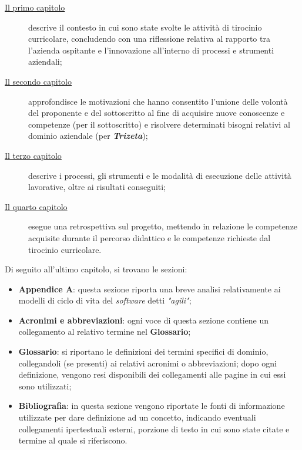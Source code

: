 \begin{description}
    \item[{\hyperref[cap:contesto-svolgimento]{Il primo capitolo}}] descrive il contesto in cui sono state svolte le attività di tirocinio curricolare, concludendo con una riflessione relativa al rapporto tra l'azienda ospitante e l'innovazione all'interno di processi e strumenti aziendali; 
    
    \item[{\hyperref[cap:motivazioni-tirocinio]{Il secondo capitolo}}] approfondisce le motivazioni che hanno consentito l'unione delle volontà del proponente e del sottoscritto al fine di acquisire nuove conoscenze e competenze (per il sottoscritto) e risolvere determinati bisogni relativi al dominio aziendale (per \textbf{\textit{Trizeta}});
    
    \item[{\hyperref[cap:elementi-progetto]{Il terzo capitolo}}] descrive i processi, gli strumenti e le modalità di esecuzione delle attività lavorative, oltre ai risultati conseguiti;
    
    \item[{\hyperref[cap:resoconto]{Il quarto capitolo}}] esegue una retrospettiva sul progetto, mettendo in relazione le competenze acquisite durante il percorso didattico e le competenze richieste dal tirocinio curricolare.
\end{description}

Di seguito all'ultimo capitolo, si trovano le sezioni:
\begin{itemize}
    \item \textbf{Appendice A}: questa sezione riporta una breve analisi relativamente ai modelli di ciclo di vita del \textit{software} detti \textit{"agili"};
    \item \textbf{Acronimi e abbreviazioni}: ogni voce di questa sezione contiene un collegamento al relativo termine nel \textbf{Glossario};
    \item \textbf{Glossario}: si riportano le definizioni dei termini specifici di dominio, collegandoli (se presenti) ai relativi acronimi o abbreviazioni; dopo ogni definizione, vengono resi disponibili dei collegamenti alle pagine in cui essi sono utilizzati;
    \item \textbf{Bibliografia}: in questa sezione vengono riportate le fonti di informazione utilizzate per dare definizione ad un concetto, indicando eventuali collegamenti ipertestuali esterni, porzione di testo in cui sono state citate e termine al quale si riferiscono.
\end{itemize}

